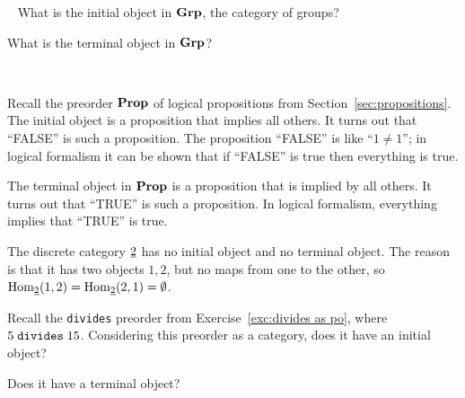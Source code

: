 \documentclass[CT4S-EN-RU]{subfiles}
\begin{document}
\begin{exampleRUS}\label{ex:initial monoid terminal monoid}
\end{exampleRUS}

\begin{exerciseENG}~
\sexc What is the initial object in ${\mathbf{Grp}}$, the category of groups?
\item What is the terminal object in ${\mathbf{Grp}}$?
\endsexc
\end{exerciseENG}

\begin{exerciseRUS}~
\end{exerciseRUS}

\begin{exampleENG}
Recall the preorder ${\mathbf{Prop}}$ of logical propositions from Section~\ref{sec:propositions}. The initial object is a proposition that implies all others. It turns out that “FALSE” is such a proposition. The proposition “FALSE” is like “$1\neq1$”; in logical formalism it can be shown that if “FALSE” is true then everything is true.

The terminal object in ${\mathbf{Prop}}$ is a proposition that is implied by all others. It turns out that “TRUE” is such a proposition. In logical formalism, everything implies that “TRUE” is true.
\end{exampleENG}

\begin{exampleRUS}
\end{exampleRUS}

\begin{exampleENG}
The discrete category $\underline{2}$ has no initial object and no terminal object. The reason is that it has two objects $1,2$, but no maps from one to the other, so $\textnormal{Hom}_{\underline{2}}(1,2)=\textnormal{Hom}_{\underline{2}}(2,1)=\emptyset$.
\end{exampleENG}

\begin{exampleRUS}
\end{exampleRUS}

\begin{exerciseENG}
Recall the {\tt divides} preorder from Exercise~\ref{exc:divides as po}, where $5\;{\tt divides}\;15$.
\sexc Considering this preorder as a category, does it have an initial object?
\item Does it have a terminal object?
\endsexc
\end{exerciseENG}

\begin{exerciseRUS}
\end{exerciseRUS}
\end{document}
